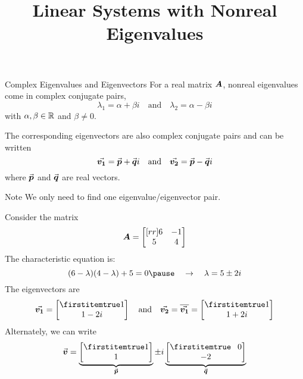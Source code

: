 \documentclass{beamer}
\title[MATH 2250 - Section 6.3]{Linear Systems with Nonreal Eigenvalues}
\begin{document}
\begin{frame}
  \titlepage
\end{frame}

\begin{frame}
\begin{block}{Complex Eigenvalues and Eigenvectors}
For a real matrix $\boldsymbol{A}$, nonreal eigenvalues come in complex conjugate pairs,
\begin{equation*}
\lambda_1=\alpha+\beta i
\quad\text{and}\quad
\lambda_2=\alpha-\beta i
\end{equation*}
with $\alpha,\beta\in\mathbb{R}$ and $\beta\neq0$.

\vspace{2mm}
The corresponding eigenvectors are also complex conjugate pairs and can be written
\begin{equation*}
{\vec{\boldsymbol{v_1}}}={\vec{\boldsymbol{p}}}+{\vec{\boldsymbol{q}}}i
\quad\text{and}\quad
{\vec{\boldsymbol{v_2}}}={\vec{\boldsymbol{p}}}-{\vec{\boldsymbol{q}}}i
\end{equation*}
where ${\vec{\boldsymbol{p}}}$ and ${\vec{\boldsymbol{q}}}$ are real vectors.
\end{block}\pause
\begin{block}{Note}
We only need to find one eigenvalue/eigenvector pair.
\end{block}
\end{frame}

\begin{frame}
\begin{example}
Consider the matrix
\begin{equation*}
\boldsymbol{A}=
\begin{bmatrix}[rr]
6 & -1 \\
5 &  4 \\
\end{bmatrix}
\end{equation*}\pause
The characteristic equation is:
\begin{equation*}
(6-\lambda)(4-\lambda)+5=0\pause
\quad\rightarrow\quad
\lambda=5\pm 2i
\end{equation*}\pause
The eigenvectors are
\begin{equation*}
\vect{v_1}=\bvector{1,1-2i}
\quad\text{and}\quad
\vect{v_2}=\overline{\vect{v_1}}=\bvector{1,1+2i}
\end{equation*}\pause
Alternately, we can write
\begin{equation*}
\vect{v}=\underbrace{\bvector{1,1}}_{\vect{p}}\pm i\underbrace{\bvector{\+0,-2}}_{\vect{q}}
\end{equation*}
\end{example}
\end{frame}
\end{document}

